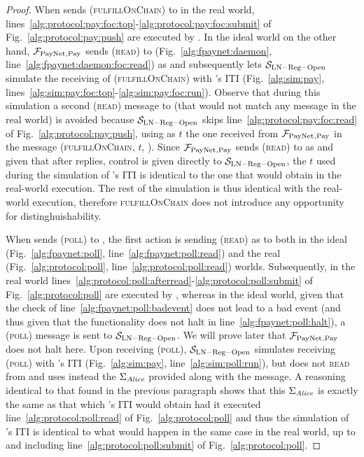 \begin{proof}
  When \environment{} sends (\textsc{fulfillOnChain}) to \alice{} in the real
  world, lines~\ref{alg:protocol:pay:foc:top}-\ref{alg:protocol:pay:foc:submit}
  of Fig.~\ref{alg:protocol:pay:push} are executed by \alice. In the ideal world
  on the other hand, $\mathcal{F}_{\mathrm{PayNet}}{}_{\mathrm{, Pay}}$ sends (\textsc{read}) to
  \ledger{} (Fig.~\ref{alg:fpaynet:daemon},
  line~\ref{alg:fpaynet:daemon:foc:read}) as \alice{} and subsequently lets
  $\mathcal{S}_{\mathrm{LN - Reg - Open}}$ simulate the receiving of
  (\textsc{fulfillOnChain}) with \alice{}'s ITI (Fig.~\ref{alg:sim:pay},
  lines~\ref{alg:sim:pay:foc:top}-\ref{alg:sim:pay:foc:run}). Observe that
  during this simulation a second (\textsc{read}) message to \ledger{} (that
  would not match any message in the real world) is avoided because
  $\mathcal{S}_{\mathrm{LN - Reg - Open}}$ skips
  line~\ref{alg:protocol:pay:foc:read} of Fig.~\ref{alg:protocol:pay:push},
  using as $t$ the one received from $\mathcal{F}_{\mathrm{PayNet}}{}_{\mathrm{, Pay}}$ in the
  message (\textsc{fulfillOnChain}, $t$, \alice). Since $\mathcal{F}_{\mathrm{PayNet}}{}_{\mathrm{,
  Pay}}$ sends (\textsc{read}) to \ledger{} as \alice{} and given that after
  \ledger{} replies, control is given directly to $\mathcal{S}_{\mathrm{LN - Reg
  - Open}}$, the $t$ used during the simulation of \alice's ITI is identical to
  the one that \alice{} would obtain in the real-world execution. The rest of
  the simulation is thus identical with the real-world execution, therefore
  \textsc{fulfillOnChain} does not introduce any opportunity for
  distinghuishability.

  When \environment{} sends (\textsc{poll}) to \alice, the first action is
  sending (\textsc{read}) as \alice{} to \ledger{} both in the ideal
  (Fig.~\ref{alg:fpaynet:poll}, line~\ref{alg:fpaynet:poll:read}) and the real
  (Fig.~\ref{alg:protocol:poll}, line~\ref{alg:protocol:poll:read}) worlds.
  Subsequently, in the real world
  lines~\ref{alg:protocol:poll:afterread}-\ref{alg:protocol:poll:submit} of
  Fig.~\ref{alg:protocol:poll} are executed by \alice, whereas in the ideal
  world, given that the check of line~\ref{alg:fpaynet:poll:badevent} does not
  lead to a bad event (and thus given that the functionality does not halt in
  line~\ref{alg:fpaynet:poll:halt}), a (\textsc{poll}) message is sent to
  $\mathcal{S}_{\mathrm{LN - Reg - Open}}$. We will prove later that
  $\mathcal{F}_{\mathrm{PayNet}}{}_{\mathrm{, Pay}}$ does not halt here. Upon receiving
  (\textsc{poll}), $\mathcal{S}_{\mathrm{LN - Reg - Open}}$ simulates receiving
  (\textsc{poll}) with \alice's ITI (Fig.~\ref{alg:sim:pay},
  line~\ref{alg:sim:poll:run}), but does not \textsc{read} from \ledger{} and
  uses instead the $\Sigma_{\mathit{Alice}}$ provided along with the message. A
  reasoning identical to that found in the previous paragraph shows that this
  $\Sigma_{\mathit{Alice}}$ is exactly the same as that which \alice's ITI would obtain
  had it executed line~\ref{alg:protocol:poll:read} of
  Fig.~\ref{alg:protocol:poll} and thus the simulation of \alice's ITI is
  identical to what would happen in the same case in the real world, up to and
  including line~\ref{alg:protocol:poll:submit} of Fig.~\ref{alg:protocol:poll}.


\end{proof}
